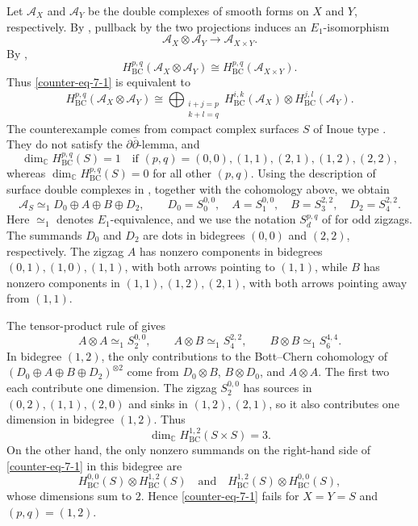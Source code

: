 \documentclass[11pt]{amsart}
\numberwithin{equation}{section}
\theoremstyle{plain}
\theoremstyle{definition}
\begin{document}
Let $\mathcal A_X$ and $\mathcal A_Y$ be the double complexes of smooth
forms on $X$ and $Y$, respectively.  By \cite{GH}, pullback by the two
projections induces an $E_1$-isomorphism
\[
\mathcal A_X\otimes\mathcal A_Y\longrightarrow\mathcal A_{X\times Y}.
\]
By \cite[Lemma 2.4]{Se21},
\[
H_{\mathrm{BC}}^{p,q}(\mathcal A_X\otimes\mathcal A_Y)
\cong H_{\mathrm{BC}}^{p,q}(\mathcal A_{X\times Y}).
\]
Thus \eqref{counter-eq-7-1} is equivalent to
\begin{equation*}%
H_{\mathrm{BC}}^{p,q}(\mathcal{A}_X \otimes\mathcal{A}_Y) \cong
\bigoplus_{\substack{i+j=p \\ k+l=q}}
H_{\mathrm{BC}}^{i,k}(\mathcal A_X) \otimes
H_{\mathrm{BC}}^{j,l}(\mathcal A_Y).
\end{equation*}
The counterexample comes from compact complex surfaces $S$ of Inoue type
\cite[\S~3]{ADT}.  They do not satisfy the $\partial\bar\partial$-lemma, and
\[
\dim_{\mathbb C}H^{p,q}_{\mathrm{BC}}(S)=1
\quad\text{if }(p,q)=(0,0),(1,1),(2,1),(1,2),(2,2),
\]
whereas $\dim_{\mathbb C}H^{p,q}_{\mathrm{BC}}(S)=0$ for all other
$(p,q)$.
Using the description of surface double complexes in
\cite[Remark 19]{S1}, together with the cohomology above, we obtain
\[
\mathcal A_S\simeq_1 D_0\oplus A\oplus B\oplus D_2,
\qquad
D_0=S_0^{0,0},\quad A=S_1^{0,0},\quad
B=S_3^{2,2},\quad D_2=S_4^{2,2}.
\]
Here $\simeq_1$ denotes $E_1$-equivalence, and we use the notation
$S_d^{p,q}$ of \cite[\S~2]{S1} for odd zigzags.  The summands $D_0$ and $D_2$
are dots in bidegrees $(0,0)$ and $(2,2)$, respectively.  The zigzag $A$ has nonzero components in bidegrees
$(0,1),(1,0),(1,1)$, with both arrows pointing to $(1,1)$, while $B$ has
nonzero components in $(1,1),(1,2),(2,1)$, with both arrows pointing away
from $(1,1)$.

The tensor-product rule of \cite[Proposition 16]{S1} gives
\[
A\otimes A\simeq_1 S_2^{0,0},\qquad
A\otimes B\simeq_1 S_4^{2,2},\qquad
B\otimes B\simeq_1 S_6^{4,4}.
\]
In bidegree $(1,2)$, the only contributions to the Bott--Chern cohomology
of $(D_0\oplus A\oplus B\oplus D_2)^{\otimes2}$ come from
$D_0\otimes B$, $B\otimes D_0$, and $A\otimes A$.
The first two each contribute one dimension.  The zigzag $S_2^{0,0}$
has sources in $(0,2),(1,1),(2,0)$ and sinks in $(1,2),(2,1)$,
so it also contributes one dimension in bidegree $(1,2)$.
Thus
\[
\dim_{\mathbb C}H_{\mathrm{BC}}^{1,2}(S\times S)=3.
\]
On the other hand, the only nonzero summands on the right-hand side of
\eqref{counter-eq-7-1} in this bidegree are
\[
H_{\mathrm{BC}}^{0,0}(S)\otimes H_{\mathrm{BC}}^{1,2}(S)
\quad\text{and}\quad
H_{\mathrm{BC}}^{1,2}(S)\otimes H_{\mathrm{BC}}^{0,0}(S),
\]
whose dimensions sum to $2$.  Hence \eqref{counter-eq-7-1} fails for
$X=Y=S$ and $(p,q)=(1,2)$.
\end{document}
